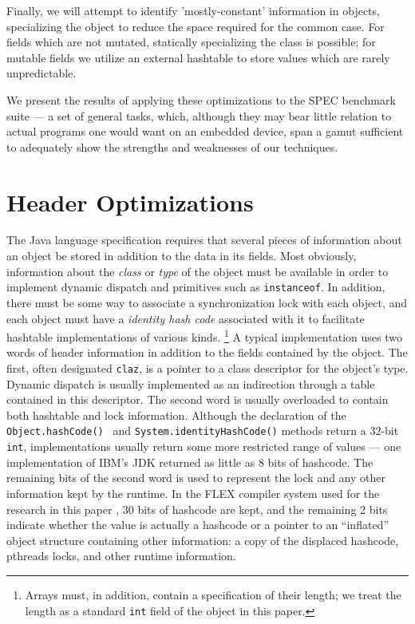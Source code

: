 \documentclass[preprint]{acmconf}
\begin{document}
Finally, we will attempt to identify 'mostly-constant' information in
objects, specializing the object to reduce the space required for
the common case.  For fields which are not mutated, statically
specializing the class is possible; for mutable fields we utilize an
external hashtable to store values which are rarely unpredictable.

We present the results of applying these optimizations to the SPEC
benchmark suite --- a set of general tasks, which, although they may bear
little relation to actual programs one would want on an embedded
device, span a gamut sufficient to adequately show the strengths and
weaknesses of our techniques.

\section{Header Optimizations}

The Java language specification requires that several pieces of
information about an object be stored in addition to the data in its
fields.  Most obviously, information about the {\it class} or {\it
  type} of the object must be available in order to implement dynamic
dispatch and primitives such as {\tt instanceof}.  In addition, there
must be some way to associate a synchronization lock with each object,
and each object must have a {\it identity hash code} associated with
it to facilitate hashtable implementations of various kinds.%
\footnote{Arrays must, in addition, contain a specification of their
  length; we treat the length as a standard {\tt int} field of the
  object in this paper.}
A typical implementation uses two words of header information in
addition to the fields contained by the object.  The first, often
designated {\tt claz}, is a pointer to a class descriptor for the
object's type.  Dynamic dispatch is usually implemented as an
indirection through a table contained in this descriptor.
The second word is usually overloaded to contain both hashtable and
lock information.  Although the declaration of the {\tt
  Object.hashCode() } and {\tt System.identityHashCode()} methods
return a 32-bit {\tt int}, implementations usually return some
more restricted range of values --- one implementation of IBM's JDK
\cite{bacon98}
returned as little as 8 bits of hashcode.  The remaining bits of the
second word is used to represent the lock and any other information
kept by the runtime.  In the FLEX compiler system used for the
research in this paper \cite{flexweb}, 30 bits of hashcode are kept, and the
remaining 2 bits indicate whether the value is actually a hashcode or
a pointer to an ``inflated'' object structure containing other
information: a copy of the displaced hashcode, pthreads locks,
and other runtime information.
\end{document}
